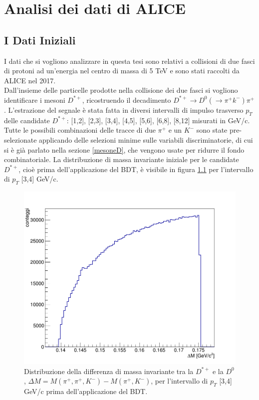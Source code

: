 \chapter{Analisi dei dati di ALICE} \label{Analisi}


\section{I Dati Iniziali}

I dati che si vogliono analizzare in questa tesi sono relativi a collisioni di due fasci di protoni ad un'energia nel centro di massa di 5 TeV e sono stati raccolti da ALICE nel 2017. 
\\Dall'insieme delle particelle prodotte nella collisione dei due fasci si vogliono identificare i mesoni $D^{*+}$, ricostruendo il decadimento $D^{*+} \rightarrow D^0(\rightarrow \pi^+ k^-) \pi^+ $. L'estrazione del segnale \`e stata fatta in diversi intervalli di impulso trasverso $p_T$ delle candidate $D^{*+}$: [1,2], [2,3], [3,4], [4,5], [5,6], [6,8], [8,12] misurati in GeV/c. Tutte le possibili combinazioni delle tracce di due $\pi^+$ e un $K^-$ sono state pre-selezionate applicando delle selezioni minime sulle variabili discriminatorie, di cui si \`e gi\`a parlato nella sezione \ref{mesoneD}, che vengono usate per ridurre il fondo combinatoriale.
La distribuzione di massa invariante iniziale per le candidate $D^{*+}$, cioè prima dell'applicazione del BDT, è visibile in figura \ref{fig:grafmassDstar1} per l'intervallo di $p_T$ [3,4] GeV/c.

    \begin{figure}[htbp]
        \centering
        \includegraphics[width=0.7\linewidth]{AnalisiDati/diffDstarD0_3to4.png}
        \caption{Distribuzione della differenza di massa invariante tra la $D^{*+}$ e la $D^0$, $\Delta M = M(\pi^+,\pi^+,K^-) - M(\pi^+,K^-)$, per l'intervallo di $p_T$ [3,4] GeV/c prima dell'applicazione del BDT.}
        \label{fig:grafmassDstar1}
    \end{figure}
    
